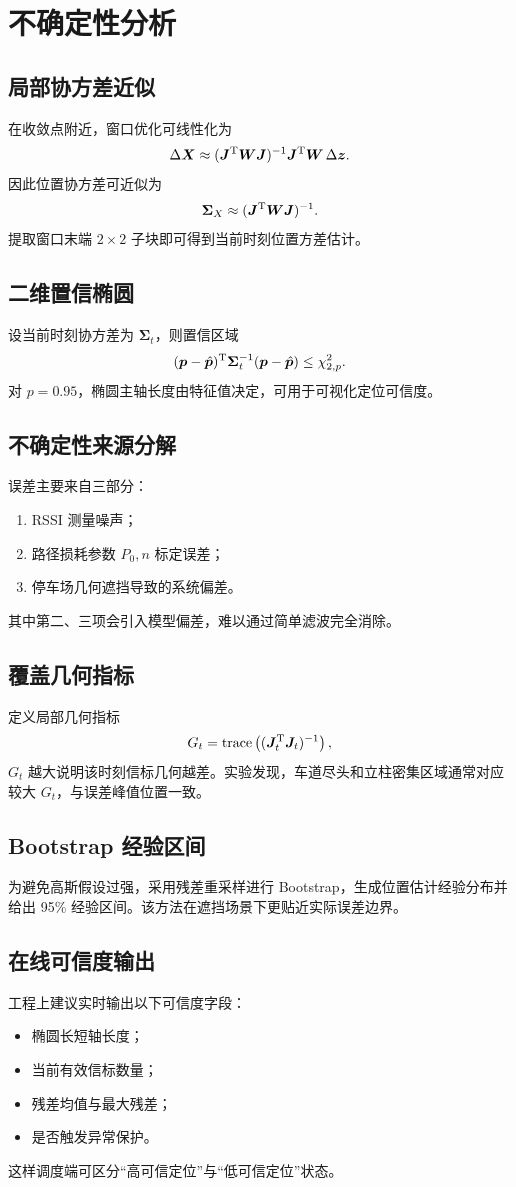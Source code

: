 \chapter{不确定性分析}

\section{局部协方差近似}
在收敛点附近，窗口优化可线性化为
\[
\Delta\bm X\approx (\bm J^{\mathrm{T}}\bm W\bm J)^{-1}\bm J^{\mathrm{T}}\bm W\,\Delta\bm z.
\]
因此位置协方差可近似为
\[
\bm\Sigma_X\approx (\bm J^{\mathrm{T}}\bm W\bm J)^{-1}.
\]
提取窗口末端 $2\times2$ 子块即可得到当前时刻位置方差估计。

\section{二维置信椭圆}
设当前时刻协方差为 $\bm\Sigma_t$，则置信区域
\[
(\bm p-\hat{\bm p})^{\mathrm{T}} \bm\Sigma_t^{-1}(\bm p-\hat{\bm p})\le \chi^2_{2,p}.
\]
对 $p=0.95$，椭圆主轴长度由特征值决定，可用于可视化定位可信度。

\section{不确定性来源分解}
误差主要来自三部分：
\begin{enumerate}
  \item RSSI 测量噪声；
  \item 路径损耗参数 $P_0,n$ 标定误差；
  \item 停车场几何遮挡导致的系统偏差。
\end{enumerate}
其中第二、三项会引入模型偏差，难以通过简单滤波完全消除。

\section{覆盖几何指标}
定义局部几何指标
\[
G_t=\operatorname{trace}\left((\bm J_t^{\mathrm{T}}\bm J_t)^{-1}\right),
\]
$G_t$ 越大说明该时刻信标几何越差。实验发现，车道尽头和立柱密集区域通常对应较大 $G_t$，与误差峰值位置一致。

\section{Bootstrap 经验区间}
为避免高斯假设过强，采用残差重采样进行 Bootstrap，生成位置估计经验分布并给出 95\% 经验区间。该方法在遮挡场景下更贴近实际误差边界。

\section{在线可信度输出}
工程上建议实时输出以下可信度字段：
\begin{itemize}
  \item 椭圆长短轴长度；
  \item 当前有效信标数量；
  \item 残差均值与最大残差；
  \item 是否触发异常保护。
\end{itemize}
这样调度端可区分“高可信定位”与“低可信定位”状态。
